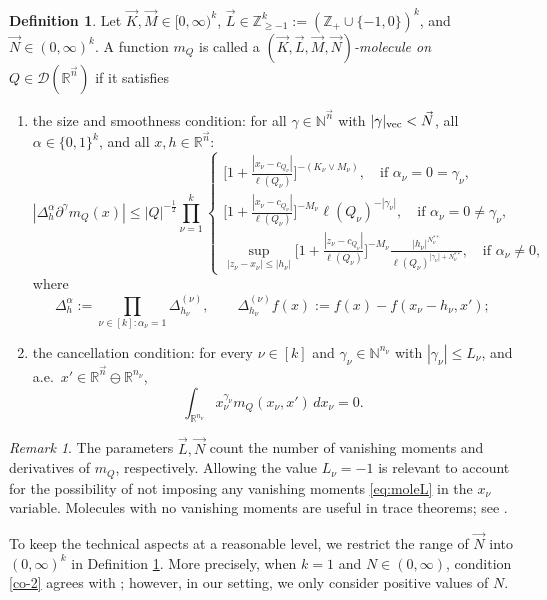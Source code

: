 \documentclass[11pt, reqno]{amsart}
\theoremstyle{definition}
\newtheorem{definition}[theorem]{Definition}
\theoremstyle{remark}
\newtheorem{remark}[theorem]{Remark}
\numberwithin{equation}{section}
\newcommand{\D}{\mathscr D}
\newcommand{\N}{\mathbb N}
\newcommand{\R}{\mathbb R}
\newcommand{\Z}{\mathbb Z}
\newcommand{\vn}{\vec n}
\newcommand{\abs}[1]{|#1|}
\begin{document}
\begin{definition}\label{moleKLMN}
Let $\vec K,\vec M\in[0,\infty)^k$, $\vec L\in\Z_{\geq-1}^k:=
(\Z_+\cup\{-1,0\})^k$, and $\vec N\in(0,\infty)^k$.
A function $m_Q$ is called a \emph{
$(\vec K,\vec L,\vec M,\vec N)$-molecule on $Q\in\D(\mathbb R^{\vec n})$}
if it satisfies
\begin{enumerate}[\rm(i)]

  \item the size and smoothness condition: for all $\gamma\in\N^{\vn}$ with $\abs{\gamma}_{\rm{vec}}<\vec N$, all $\alpha\in\{0,1\}^k$, and all $x,h\in\R^{\vn}$:
\begin{equation}\label{co-2}
  \abs{\Delta_h^\alpha\partial^\gamma m_Q(x)}
  \leq   \abs{Q}^{-\frac12}
  \prod_{\nu=1}^k  \begin{cases} \displaystyle
   \Big[1+\frac{\abs{x_\nu-c_{Q_\nu}}}{\ell(Q_\nu)}\Big]^{-(K_{\nu}\vee M_{\nu})},\quad \text{if }\alpha_\nu=0=\gamma_\nu, \\
   \displaystyle
  \Big[1+\frac{\abs{x_\nu-c_{Q_\nu}}}{\ell(Q_\nu)}\Big]^{-M_{\nu}}\ell(Q_\nu)^{-\abs{\gamma_\nu}},
  \quad \text{if }\alpha_\nu=0\neq \gamma_\nu, \\
  \displaystyle
  \sup_{\abs{z_\nu-x_\nu}\leq\abs{h_\nu}} \Big[1+\frac{\abs{z_\nu-c_{Q_\nu}}}{\ell(Q_\nu)}\Big]^{-M_{\nu}}
  \frac{\abs{h_\nu}^{N_\nu^{**}}}{ \ell(Q_\nu)^{\abs{\gamma_\nu}+N_\nu^{**}}},
  \quad \text{if }\alpha_\nu\neq 0,
\end{cases}
\end{equation}
where
\begin{equation}\label{Delta}
  \Delta_h^\alpha:=\prod_{\nu\in[k]:\alpha_\nu=1} \Delta_{h_\nu}^{(\nu)},\qquad
   \Delta_{h_\nu}^{(\nu)}f(x)
   :=f(x)-f(x_\nu-h_\nu,x');
\end{equation}

\item the cancellation condition: for every $\nu\in[k]$ and
$\gamma_\nu\in\mathbb{N}^{n_\nu}$ with $|\gamma_\nu|\leq L_\nu$,
and a.e.\ $x'\in\R^{\vn}\ominus\R^{n_\nu}$,
\begin{equation}\label{eq:moleL}
  \int_{\mathbb R^{n_\nu}} x_\nu^{\gamma_\nu} m_Q(x_\nu,x')\,dx_\nu=0.
\end{equation}
\end{enumerate}
\end{definition}

\begin{remark}\label{rem:moleKLMN}
The parameters $\vec L,\vec N$ count the number of vanishing moments and derivatives of $m_Q$, respectively. Allowing the value $L_\nu=-1$ is relevant to account for the possibility of not imposing any vanishing moments \eqref{eq:moleL} in the $x_\nu$ variable. Molecules with no vanishing moments are useful in trace theorems; see \cite[Remark 5.7]{BHYY:1c}.

To keep the technical aspects at a reasonable level,
we restrict the range of $\vec N$ into $(0,\infty)^k$
in Definition \ref{moleKLMN}.
More precisely, when
$k=1$ and $N\in(0,\infty)$,
condition \eqref{co-2} agrees with
\cite[(1.1.6), (1.1.8), and (1.1.9)]{tor}; however,
in our setting, we only consider positive values of $N$.
\end{remark}
\end{document}
